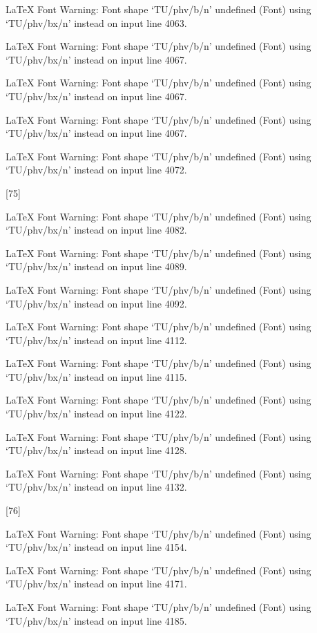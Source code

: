 LaTeX Font Warning: Font shape `TU/phv/b/n' undefined
(Font)              using `TU/phv/bx/n' instead on input line 4063.


LaTeX Font Warning: Font shape `TU/phv/b/n' undefined
(Font)              using `TU/phv/bx/n' instead on input line 4067.


LaTeX Font Warning: Font shape `TU/phv/b/n' undefined
(Font)              using `TU/phv/bx/n' instead on input line 4067.


LaTeX Font Warning: Font shape `TU/phv/b/n' undefined
(Font)              using `TU/phv/bx/n' instead on input line 4067.


LaTeX Font Warning: Font shape `TU/phv/b/n' undefined
(Font)              using `TU/phv/bx/n' instead on input line 4072.

[75]

LaTeX Font Warning: Font shape `TU/phv/b/n' undefined
(Font)              using `TU/phv/bx/n' instead on input line 4082.


LaTeX Font Warning: Font shape `TU/phv/b/n' undefined
(Font)              using `TU/phv/bx/n' instead on input line 4089.


LaTeX Font Warning: Font shape `TU/phv/b/n' undefined
(Font)              using `TU/phv/bx/n' instead on input line 4092.


LaTeX Font Warning: Font shape `TU/phv/b/n' undefined
(Font)              using `TU/phv/bx/n' instead on input line 4112.


LaTeX Font Warning: Font shape `TU/phv/b/n' undefined
(Font)              using `TU/phv/bx/n' instead on input line 4115.


LaTeX Font Warning: Font shape `TU/phv/b/n' undefined
(Font)              using `TU/phv/bx/n' instead on input line 4122.


LaTeX Font Warning: Font shape `TU/phv/b/n' undefined
(Font)              using `TU/phv/bx/n' instead on input line 4128.


LaTeX Font Warning: Font shape `TU/phv/b/n' undefined
(Font)              using `TU/phv/bx/n' instead on input line 4132.

[76]

LaTeX Font Warning: Font shape `TU/phv/b/n' undefined
(Font)              using `TU/phv/bx/n' instead on input line 4154.


LaTeX Font Warning: Font shape `TU/phv/b/n' undefined
(Font)              using `TU/phv/bx/n' instead on input line 4171.


LaTeX Font Warning: Font shape `TU/phv/b/n' undefined
(Font)              using `TU/phv/bx/n' instead on input line 4185.

